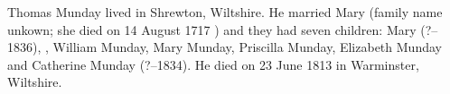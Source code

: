 
Thomas Munday lived in Shrewton, Wiltshire.
He married Mary (family name unkown; she died on 14 August 1717 \cite{ThomasMundayDeath}) and they had seven children:
Mary (?--1836), , William Munday, Mary Munday, Priscilla Munday, Elizabeth Munday and Catherine Munday (?--1834).
He died on 23 June 1813 in Warminster, Wiltshire.\cite{ThomasMundayDeath}
